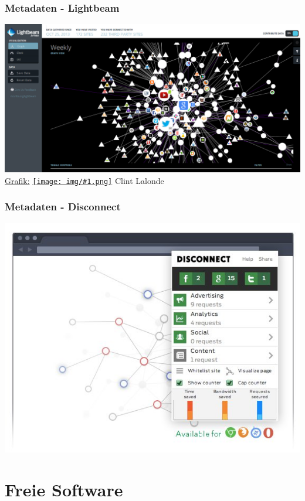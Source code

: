 \documentclass[12pt]{beamer}
\newcommand{\cc}[1]{\texttt{[image: img/\#1.png]}\hspace{1mm}}
\begin{document}
\begin{frame}
    \frametitle{Metadaten - Lightbeam}
    \includegraphics[height=0.7\textheight]{img/lightbeam.png}
  \\{\small \href{http://www.flickr.com/photos/8517757@N03/10538205035/in/photolist-h4e4dg}{Grafik:} \href{http://creativecommons.org/licenses/by-sa/3.0/deed.en}{\cc{by-sa}} Clint Lalonde}
\end{frame}

\begin{frame}
  \frametitle{Metadaten - Disconnect}
  \includegraphics[height=0.7\textheight]{img/disconnectme.jpg}
\end{frame}


\section{Freie Software}
\subsection{}
\end{document}
